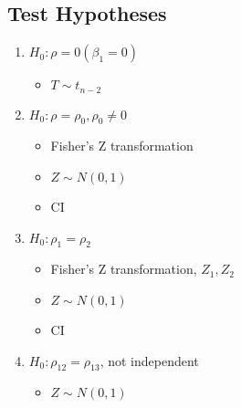 \documentclass[paper=a4, fontsize=11pt]{scrartcl} %
\numberwithin{equation}{section} %
\numberwithin{figure}{section} %
\numberwithin{table}{section} %
\begin{document}
\subsection{Test Hypotheses}
\begin{enumerate}
\item $H_0: \rho = 0 (\beta_1 = 0)$ 
	\begin{itemize}
	\item $T \sim t_{n-2}$
	\end{itemize}
\item $H_0: \rho = \rho_0, \rho_0 \neq 0$\\
	\begin{itemize}
	\item Fisher's Z transformation
	\item $Z \sim N(0,1)$
	\item CI
	\end{itemize}
\item $H_0: \rho_1 = \rho_2$\\
	\begin{itemize}
	\item Fisher's Z transformation, $Z_1, Z_2$
	\item $Z \sim N(0,1)$
	\item CI
	\end{itemize}
\item $H_0: \rho_{12} = \rho_{13}$, not independent
	\begin{itemize}
	\item $Z \sim N(0, 1)$
	\end{itemize}
\end{enumerate}

\end{document}
